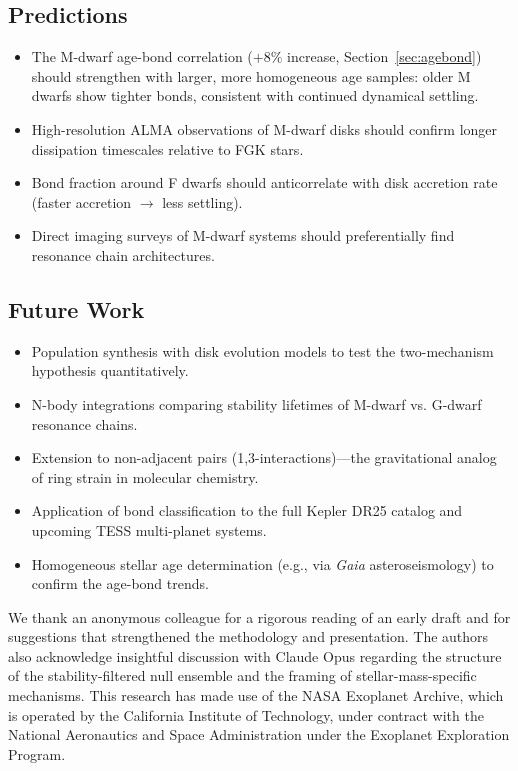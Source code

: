 \documentclass[twocolumn]{aastex631}
\begin{document}
\subsection{Predictions}
\begin{itemize}
  \item The M-dwarf age-bond correlation ($+8\%$ increase, Section~\ref{sec:agebond}) should strengthen with larger, more homogeneous age samples: older M dwarfs show tighter bonds, consistent with continued dynamical settling.
  \item High-resolution ALMA observations of M-dwarf disks should confirm
        longer dissipation timescales relative to FGK stars.
  \item Bond fraction around F dwarfs should anticorrelate with disk accretion
        rate (faster accretion $\rightarrow$ less settling).
  \item Direct imaging surveys of M-dwarf systems should preferentially find
        resonance chain architectures.
\end{itemize}

\subsection{Future Work}
\begin{itemize}
  \item Population synthesis with disk evolution models to test the
        two-mechanism hypothesis quantitatively.
  \item N-body integrations comparing stability lifetimes of M-dwarf vs.
        G-dwarf resonance chains.
  \item Extension to non-adjacent pairs (1,3-interactions)---the gravitational
        analog of ring strain in molecular chemistry.
  \item Application of bond classification to the full Kepler DR25 catalog and
        upcoming TESS multi-planet systems.
  \item Homogeneous stellar age determination (e.g., via \textit{Gaia} asteroseismology)
        to confirm the age-bond trends.
\end{itemize}

\begin{acknowledgments}
We thank an anonymous colleague for a rigorous reading of an early draft and
for suggestions that strengthened the methodology and presentation. The authors
also acknowledge insightful discussion with Claude Opus regarding the structure
of the stability-filtered null ensemble and the framing of stellar-mass-specific
mechanisms.
This research has made use of the NASA Exoplanet Archive, which is operated by
the California Institute of Technology, under contract with the National
Aeronautics and Space Administration under the Exoplanet Exploration Program.
\end{acknowledgments}



\end{document}

